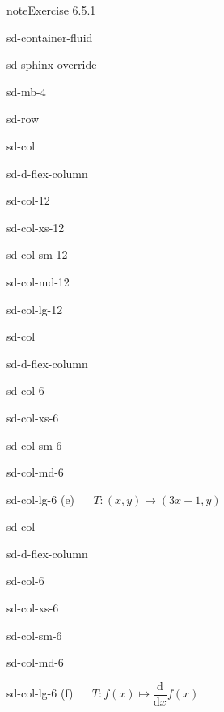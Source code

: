 \documentclass[letterpaper,10pt,english]{jupyterBook}
\begin{document}
\begin{sphinxadmonition}{note}{Exercise 6.5.1}
\begin{sphinxuseclass}{sd-container-fluid}
\begin{sphinxuseclass}{sd-sphinx-override}
\begin{sphinxuseclass}{sd-mb-4}
\begin{sphinxuseclass}{sd-row}
\begin{sphinxuseclass}{sd-col}
\begin{sphinxuseclass}{sd-d-flex-column}
\begin{sphinxuseclass}{sd-col-12}
\begin{sphinxuseclass}{sd-col-xs-12}
\begin{sphinxuseclass}{sd-col-sm-12}
\begin{sphinxuseclass}{sd-col-md-12}
\begin{sphinxuseclass}{sd-col-lg-12}
\end{sphinxuseclass}
\end{sphinxuseclass}
\end{sphinxuseclass}
\end{sphinxuseclass}
\end{sphinxuseclass}
\end{sphinxuseclass}
\end{sphinxuseclass}
\begin{sphinxuseclass}{sd-col}
\begin{sphinxuseclass}{sd-d-flex-column}
\begin{sphinxuseclass}{sd-col-6}
\begin{sphinxuseclass}{sd-col-xs-6}
\begin{sphinxuseclass}{sd-col-sm-6}
\begin{sphinxuseclass}{sd-col-md-6}
\begin{sphinxuseclass}{sd-col-lg-6}
\sphinxAtStartPar
(e)   \(T: (x, y) \mapsto (3x + 1, y)\)

\end{sphinxuseclass}
\end{sphinxuseclass}
\end{sphinxuseclass}
\end{sphinxuseclass}
\end{sphinxuseclass}
\end{sphinxuseclass}
\end{sphinxuseclass}
\begin{sphinxuseclass}{sd-col}
\begin{sphinxuseclass}{sd-d-flex-column}
\begin{sphinxuseclass}{sd-col-6}
\begin{sphinxuseclass}{sd-col-xs-6}
\begin{sphinxuseclass}{sd-col-sm-6}
\begin{sphinxuseclass}{sd-col-md-6}
\begin{sphinxuseclass}{sd-col-lg-6}
\sphinxAtStartPar
(f)   \(T: f(x) \mapsto \dfrac{\mathrm{d}}{\mathrm{d}x} f(x)\)


\end{sphinxuseclass}
\end{sphinxuseclass}
\end{sphinxuseclass}
\end{sphinxuseclass}
\end{sphinxuseclass}
\end{sphinxuseclass}
\end{sphinxuseclass}
\end{sphinxuseclass}
\end{sphinxuseclass}
\end{sphinxuseclass}
\end{sphinxuseclass}
\end{sphinxadmonition}
\end{document}
